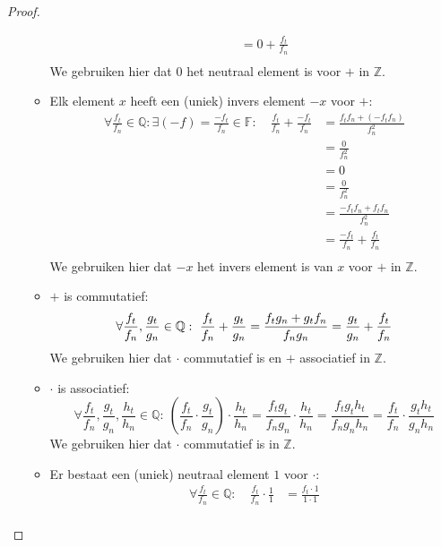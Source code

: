 \documentclass[main.tex]{subfiles}
\begin{document}
\begin{pr}
\begin{proof}
\begin{itemize}
\begin{itemize}
\[\begin{array}{rrl}
          &&= 0 +  \frac{f_{t}}{f_{n}}\\
        \end{array}
        \]
        We gebruiken hier dat $0$ het neutraal element is voor $+$ in $\mathbb{Z}$.
      \item Elk element $x$ heeft een (uniek) invers element $-x$ voor $+$:
        \[
        \begin{array}{rrl}
          \forall \frac{f_{t}}{f_{n}}\in \mathbb{Q}: \exists (-f) = \frac{-f_{t}}{f_{n}} \in \mathbb{F}: \ 
          &\frac{f_{t}}{f_{n}} + \frac{-f_{t}}{f_{n}}
          &= \frac{f_{t}f_{n} + (-f_{t}f_{n})}{f_{n}^{2}}\\
          &&= \frac{0}{f_{n}^{2}}\\
          &&= 0 \\
          &&= \frac{0}{f_{n}^{2}}\\
          &&= \frac{-f_{t}f_{n} + f_{t}f_{n}}{f_{n}^{2}}\\
          &&= \frac{-f_{t}}{f_{n}} + \frac{f_{t}}{f_{n}}\\
        \end{array}
        \]
        We gebruiken hier dat $-x$ het invers element is van $x$ voor $+$ in $\mathbb{Z}$. 
      \item $+$ is commutatief:
        \[
        \forall \frac{f_{t}}{f_{n}},\frac{g_{t}}{g_{n}} \in \mathbb{Q}:\
        \frac{f_{t}}{f_{n}} + \frac{g_{t}}{g_{n}}
        = \frac{f_{t}g_{n}+g_{t}f_{n}}{f_{n}g_{n}}\\ 
        = \frac{g_{t}}{g_{n}} + \frac{f_{t}}{f_{n}}\\
        \]
        We gebruiken hier dat $\cdot$ commutatief is en $+$ associatief in $\mathbb{Z}$.
      \item $\cdot$ is associatief:
        \[
        \forall \frac{f_{t}}{f_{n}},\frac{g_{t}}{g_{n}},\frac{h_{t}}{h_{n}} \in \mathbb{Q}:\
        \left(\frac{f_{t}}{f_{n}} \cdot \frac{g_{t}}{g_{n}}\right) \cdot \frac{h_{t}}{h_{n}}
        =\frac{f_{t}g_{t}}{f_{n}g_{n}} \cdot \frac{h_{t}}{h_{n}}
        =\frac{f_{t}g_{t}h_{t}}{f_{n}g_{n}h_{n}}
        =\frac{f_{t}}{f_{n}} \cdot \frac{g_{t}h_{t}}{g_{n}h_{n}}
        \]
       We gebruiken hier dat $\cdot$ commutatief is in $\mathbb{Z}$.
      \item Er bestaat een (uniek) neutraal element $1$ voor $\cdot$:
        \[
        \begin{array}{rrl}
          \forall \frac{f_{t}}{f_{n}}\in \mathbb{Q}:\
          &\frac{f_{t}}{f_{n}} \cdot \frac{1}{1}
          &= \frac{f_{t}\cdot 1}{1 \cdot 1}\\

\end{array}\]
\end{itemize}
\end{itemize}
\end{proof}
\end{pr}
\end{document}

